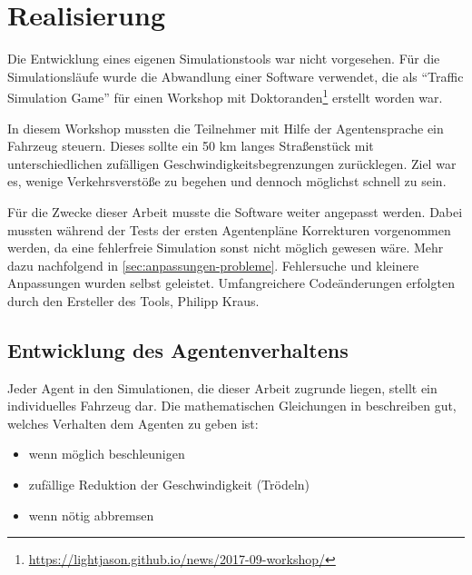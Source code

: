 \section{Realisierung}
\label{sec:realisierung}

Die Entwicklung eines eigenen Simulationstools war nicht vorgesehen.
Für die Simulationsläufe wurde die Abwandlung einer Software verwendet, die als \enquote{Traffic Simulation Game} für einen Workshop mit Doktoranden\footnote{\url{https://lightjason.github.io/news/2017-09-workshop/}} erstellt worden war.

In diesem Workshop mussten die Teilnehmer mit Hilfe der Agentensprache ein Fahrzeug steuern. Dieses sollte ein 50 km langes Straßenstück mit unterschiedlichen zufälligen Geschwindigkeitsbegrenzungen zurücklegen. Ziel war es, wenige Verkehrsverstöße zu begehen und dennoch möglichst schnell zu sein.

Für die Zwecke dieser Arbeit musste die Software weiter angepasst werden.
Dabei mussten während der Tests der ersten Agentenpläne Korrekturen vorgenommen werden, da eine fehlerfreie Simulation sonst nicht möglich gewesen wäre. 
Mehr dazu nachfolgend in \cref{sec:anpassungen-probleme}.
Fehlersuche und kleinere Anpassungen wurden selbst geleistet.
Umfangreichere Codeänderungen erfolgten durch den Ersteller des Tools, Philipp Kraus.




\subsection{Entwicklung des Agentenverhaltens}%
\label{sec:entwicklung-agentenplan}

Jeder Agent in den Simulationen, die dieser Arbeit zugrunde liegen, stellt ein individuelles Fahrzeug dar.
Die mathematischen Gleichungen in \cite{na-sch} beschreiben gut, welches Verhalten dem Agenten zu geben ist: 
\begin{itemize}
\itemsep0em
	\item wenn möglich beschleunigen
	\item zufällige Reduktion der Geschwindigkeit (Trödeln)
	\item wenn nötig abbremsen
\end{itemize}


